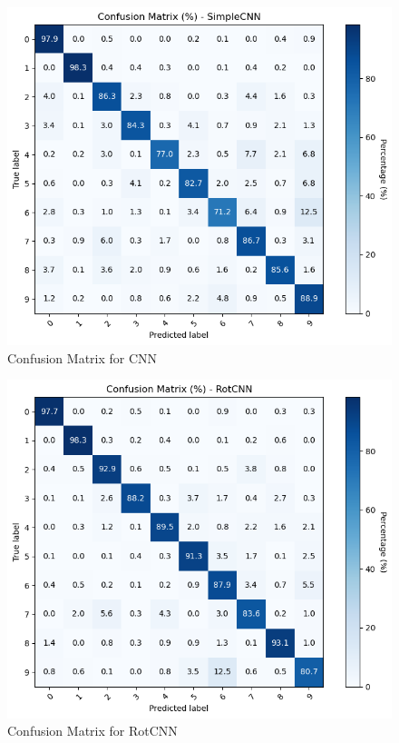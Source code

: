 \documentclass[12pt]{article}
\begin{document}
\begin{figure}[H]
    \centering
    \includegraphics[width=1.0\textwidth]{pics/cnntest.png}
    \caption{Confusion Matrix for CNN}
    \label{fig:cnn}
\end{figure}

\begin{figure}[H]
    \centering
    \includegraphics[width=1.0\textwidth]{pics/rotcnntest.png}
    \caption{Confusion Matrix for RotCNN}
    \label{fig:rotcnn}
\end{figure}
\end{document}
